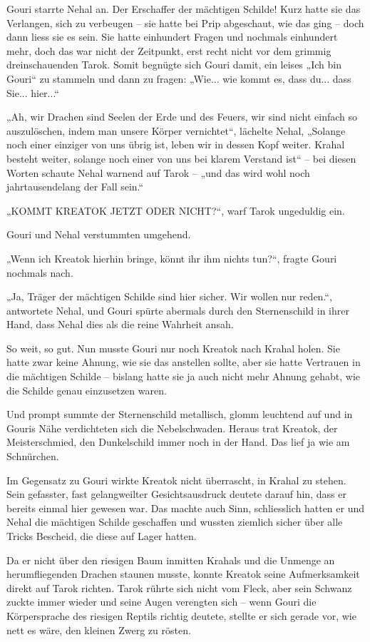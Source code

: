 Gouri starrte Nehal an. Der Erschaffer der mächtigen Schilde! Kurz hatte sie das Verlangen, sich zu verbeugen – sie hatte bei Prip abgeschaut, wie das ging – doch dann liess sie es sein. Sie hatte einhundert Fragen und nochmals einhundert mehr, doch das war nicht der Zeitpunkt, erst recht nicht vor dem grimmig dreinschauenden Tarok. Somit begnügte sich Gouri damit, ein leises „Ich bin Gouri“ zu stammeln und dann zu fragen: „Wie... wie kommt es, dass du... dass Sie... hier...“

„Ah, wir Drachen sind Seelen der Erde und des Feuers, wir sind nicht einfach so auszulöschen, indem man unsere Körper vernichtet“, lächelte Nehal, „Solange noch einer einziger von uns übrig ist, leben wir in dessen Kopf weiter. Krahal besteht weiter, solange noch einer von uns bei klarem Verstand ist“ – bei diesen Worten schaute Nehal warnend auf Tarok – „und das wird wohl noch jahrtausendelang der Fall sein.“

„KOMMT KREATOK JETZT ODER NICHT?“, warf Tarok ungeduldig ein.

Gouri und Nehal verstummten umgehend.

„Wenn ich Kreatok hierhin bringe, könnt ihr ihm nichts tun?“, fragte Gouri nochmals nach.

„Ja, Träger der mächtigen Schilde sind hier sicher. Wir wollen nur reden.“, antwortete Nehal, und Gouri spürte abermals durch den Sternenschild in ihrer Hand, dass Nehal dies als die reine Wahrheit ansah.

So weit, so gut. Nun musste Gouri nur noch Kreatok nach Krahal holen. Sie hatte zwar keine Ahnung, wie sie das anstellen sollte, aber sie hatte Vertrauen in die mächtigen Schilde – bislang hatte sie ja auch nicht mehr Ahnung gehabt, wie die Schilde genau einzusetzen waren.

Und prompt summte der Sternenschild metallisch, glomm leuchtend auf und in Gouris Nähe verdichteten sich die Nebelschwaden. Heraus trat Kreatok, der Meisterschmied, den Dunkelschild immer noch in der Hand. Das lief ja wie am Schnürchen.

Im Gegensatz zu Gouri wirkte Kreatok nicht überrascht, in Krahal zu stehen. Sein gefasster, fast gelangweilter Gesichtsausdruck deutete darauf hin, dass er bereits einmal hier gewesen war. Das machte auch Sinn, schliesslich hatten er und Nehal die mächtigen Schilde geschaffen und wussten ziemlich sicher über alle Tricks Bescheid, die diese auf Lager hatten.

Da er nicht über den riesigen Baum inmitten Krahals und die Unmenge an herumfliegenden Drachen staunen musste, konnte Kreatok seine Aufmerksamkeit direkt auf Tarok richten. Tarok rührte sich nicht vom Fleck, aber sein Schwanz zuckte immer wieder und seine Augen verengten sich – wenn Gouri die Körpersprache des riesigen Reptils richtig deutete, stellte er sich gerade vor, wie nett es wäre, den kleinen Zwerg zu rösten.

